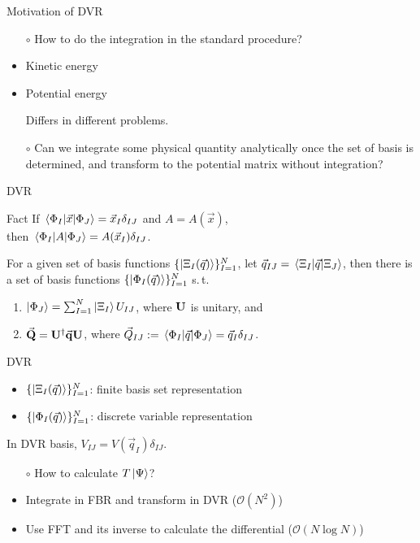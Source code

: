 \documentclass[12pt]{beamer}
\newcommand{\BigO}[1]{\mathcal{O}\!\left(#1\right)}
\begin{document}
    \begin{frame}{Motivation of DVR}
        \begin{itemize}
            \item[$\circ$] How to do the integration in the standard procedure?
            \item Kinetic energy
            \item Potential energy

            Differs in different problems.
            \item[$\circ$] Can we integrate some physical quantity analytically once the set of basis is determined, and transform to the potential matrix without integration?
        \end{itemize} 
    \end{frame}

    \begin{frame}{DVR}
        \begin{block}{Fact}
            If $\mel{\Phi_I}{\vec{x}}{\Phi_J} = \vec{x}_I\delta_{IJ}$ and $A = A(\vec{x})$,\\
            then $\mel{\Phi_I}{A}{\Phi_J} = A(\vec{x}_I)\delta_{IJ}$.
        \end{block}
        For a given set of basis functions $\{ \ket{\Xi_I(\vec{q})} \}_{I=1}^N$, let $\vec{q}_{IJ} = \mel{\Xi_I}{\vec{q}}{\Xi_J}$, then there is a set of basis functions $\{ \ket{\Phi_I(\vec{q})} \}_{I=1}^N$ s.\,t.\, 
        \begin{enumerate}
            \item $\ket{\Phi_J} = \sum_{I=1}^N \ket{\Xi_I} U_{IJ}$, where $\vb{U}$ is unitary, and
            \item $\va{Q} = \vb{U}^\dagger \va{q} \vb{U}$, where $\vec{Q}_{IJ} := \mel{\Phi_I}{\vec{q}}{\Phi_J} = \vec{q}_I\delta_{IJ}$.
        \end{enumerate}
    \end{frame}

    \begin{frame}{DVR}
        \begin{itemize}
            \item $\{ \ket{\Xi_I(\vec{q})} \}_{I=1}^N$: finite basis set representation
            \item $\{ \ket{\Phi_I(\vec{q})} \}_{I=1}^N$: discrete variable representation
        \end{itemize}
        In DVR basis, $V_{IJ} = V(\vec{q}_I)\delta_{IJ}$.
        \begin{itemize}
            \item[$\circ$] How to calculate $T\ket{\Psi}$?
            \item Integrate in FBR and transform in DVR ($\BigO{N^2}$)
            \item Use FFT and its inverse to calculate the differential ($\BigO{N \log{N}}$)
        \end{itemize}
    \end{frame}
\end{document}
